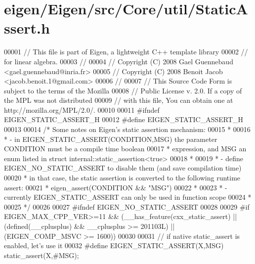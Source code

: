\hypertarget{eigen_2_eigen_2src_2_core_2util_2_static_assert_8h_source}{}\section{eigen/\+Eigen/src/\+Core/util/\+Static\+Assert.h}
\label{eigen_2_eigen_2src_2_core_2util_2_static_assert_8h_source}

\begin{DoxyCode}
00001 \textcolor{comment}{// This file is part of Eigen, a lightweight C++ template library}
00002 \textcolor{comment}{// for linear algebra.}
00003 \textcolor{comment}{//}
00004 \textcolor{comment}{// Copyright (C) 2008 Gael Guennebaud <gael.guennebaud@inria.fr>}
00005 \textcolor{comment}{// Copyright (C) 2008 Benoit Jacob <jacob.benoit.1@gmail.com>}
00006 \textcolor{comment}{//}
00007 \textcolor{comment}{// This Source Code Form is subject to the terms of the Mozilla}
00008 \textcolor{comment}{// Public License v. 2.0. If a copy of the MPL was not distributed}
00009 \textcolor{comment}{// with this file, You can obtain one at http://mozilla.org/MPL/2.0/.}
00010 
00011 \textcolor{preprocessor}{#ifndef EIGEN\_STATIC\_ASSERT\_H}
00012 \textcolor{preprocessor}{#define EIGEN\_STATIC\_ASSERT\_H}
00013 
00014 \textcolor{comment}{/* Some notes on Eigen's static assertion mechanism:}
00015 \textcolor{comment}{ *}
00016 \textcolor{comment}{ *  - in EIGEN\_STATIC\_ASSERT(CONDITION,MSG) the parameter CONDITION must be a compile time boolean}
00017 \textcolor{comment}{ *    expression, and MSG an enum listed in struct internal::static\_assertion<true>}
00018 \textcolor{comment}{ *}
00019 \textcolor{comment}{ *  - define EIGEN\_NO\_STATIC\_ASSERT to disable them (and save compilation time)}
00020 \textcolor{comment}{ *    in that case, the static assertion is converted to the following runtime assert:}
00021 \textcolor{comment}{ *      eigen\_assert(CONDITION && "MSG")}
00022 \textcolor{comment}{ *}
00023 \textcolor{comment}{ *  - currently EIGEN\_STATIC\_ASSERT can only be used in function scope}
00024 \textcolor{comment}{ *}
00025 \textcolor{comment}{ */}
00026 
00027 \textcolor{preprocessor}{#ifndef EIGEN\_NO\_STATIC\_ASSERT}
00028 
00029 \textcolor{preprocessor}{  #if EIGEN\_MAX\_CPP\_VER>=11 && (\_\_has\_feature(cxx\_static\_assert) || (defined(\_\_cplusplus) && \_\_cplusplus >=
       201103L) || (EIGEN\_COMP\_MSVC >= 1600))}
00030 
00031     \textcolor{comment}{// if native static\_assert is enabled, let's use it}
00032 \textcolor{preprocessor}{    #define EIGEN\_STATIC\_ASSERT(X,MSG) static\_assert(X,#MSG);}

\end{DoxyCode}
